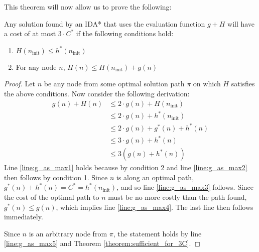 This theorem will now allow us to prove the following:
\begin{theorem}
\label{theorem:g_as_max}
Any solution found by an IDA* that uses the evaluation function $g+H$ will have a cost of at most $3 \cdot C^*$ if the following conditions hold:
\begin{enumerate}
\item $H(n_{\mathrm{init}}) \leq h^*(n_{\mathrm{init}})$
\item For any node $n$, $H(n) \leq H(n_{\mathrm{init}}) + g(n)$
\end{enumerate}
\end{theorem}
\begin{proof}
Let $n$ be any node from some optimal solution path $\pi$ on which $H$ satisfies the above conditions.
Now consider the following derivation:
\begin{align}
g(n) + H(n) &\leq 2\cdot g(n) + H(n_{\mathrm{init}})\label{line:g_as_max1}\\ 
& \leq 2 \cdot g(n) + h^*(n_{\mathrm{init}})\label{line:g_as_max2}\\
& \leq 2 \cdot g(n) + g^*(n) + h^*(n)\label{line:g_as_max3}\\
& \leq 3 \cdot g(n) + h^*(n) \label{line:g_as_max4}\\
& \leq 3(g(n) + h^*(n))\label{line:g_as_max5}
\end{align}
Line \ref{line:g_as_max1} holds because by condition 2 and line \ref{line:g_as_max2} then follows by condition 1.
Since $n$ is along an optimal path, $g^*(n) + h^*(n)=C^* = h^*(n_{\mathrm{init}})$, and so line \ref{line:g_as_max3} follows.
Since the cost of the optimal path to $n$ must be no more costly than the path found, $g^*(n)\leq g(n)$, which implies line \ref{line:g_as_max4}.
The last line then follows immediately.

Since $n$ is an arbitrary node from $\pi$, the statement holds by line \ref{line:g_as_max5} and Theorem \ref{theorem:sufficient_for_3C}.
\end{proof}

